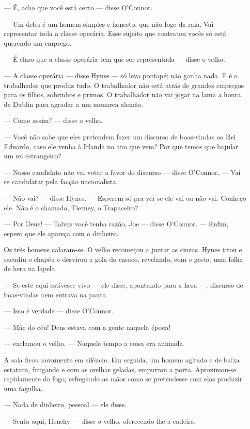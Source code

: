 --- É, acho que você está certo --- disse O'Connor.

--- Um deles é um homem simples e honesto, que não foge da raia. Vai
representar toda a classe operária. Esse sujeito que contratou vocês
só está querendo um emprego.

--- É claro que a classe operária tem que ser representada --- disse o
velho.

--- A classe operária --- disse Hynes --- só leva pontapé; não ganha
nada. E é o trabalhador que produz tudo. O trabalhador não está atrás
de grandes empregos para os filhos, sobrinhos e primos. O trabalhador
não vai jogar na lama a honra de Dublin para agradar a um monarca
alemão.

--- Como assim? --- disse o velho.

--- Você não sabe que eles pretendem fazer um discurso de boas-vindas
ao Rei Eduardo, caso ele venha à Irlanda no ano que vem? Por que temos
que bajular um rei estrangeiro?

--- Nosso candidato não vai votar a favor do discurso --- disse
O'Connor. --- Vai se candidatar pela facção nacionalista.

--- Não vai? --- disse Hynes. --- Esperem só pra ver se ele vai ou
não vai. Conheço ele. Não é o chamado, Tierney, o Trapaceiro?

--- Por Deus! --- Talvez você tenha razão, Joe --- disse O'Connor.
--- Enfim, espero que ele apareça com o dinheiro.

Os três homens calaram-se. O velho recomeçou a juntar as cinzas.
Hynes tirou e sacudiu o chapéu e desvirou a gola do casaco, revelando,
com o gesto, uma folha de hera na lapela.

--- Se este aqui estivesse vivo --- ele disse, apontando para a hera
---, discurso de boas-vindas nem entrava na pauta.

--- Isso é verdade --- disse O'Connor.

--- Mãe do céu! Deus estava com a gente naquela época!

--- exclamou o velho. --- Naquele tempo a coisa era animada.

A sala ficou novamente em silêncio. Em seguida, um homem agitado e de
baixa estatura, fungando e com as orelhas geladas, empurrou a porta.
Aproximou-se rapidamente do fogo, esfregando as mãos como se
pretendesse com elas produzir uma fagulha.

--- Nada de dinheiro, pessoal --- ele disse.

--- Senta aqui, Henchy --- disse o velho, oferecendo-lhe a cadeira.

